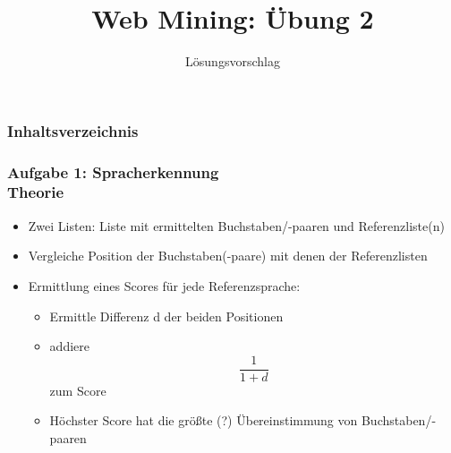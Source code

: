 \documentclass[accentcolor=tud7b,noresetcounter]{tudbeamer}
\title%
{Web Mining: Übung 2}
\subtitle{Lösungsvorschlag}
\author[Ingo Adrian und Steffen Pegenau]{}
\institute[Fachbereich Informatik]{}
\date[\today]
\begin{document}
  
  \begin{titleframe}
  \end{titleframe}
  
  \begin{frame}
	\frametitle{Inhaltsverzeichnis}
	\tableofcontents
  \end{frame}
  
  \begin{frame}
	\frametitle{Aufgabe 1: Spracherkennung\\
	Theorie}
	\begin{itemize}
		\item Zwei Listen: Liste mit ermittelten Buchstaben/-paaren und Referenzliste(n)
		\item Vergleiche Position der Buchstaben(-paare) mit denen der Referenzlisten
		\item Ermittlung eines Scores für jede Referenzsprache:
			\begin{itemize}
				\item Ermittle Differenz d der beiden Positionen
				\item addiere $$\frac{1}{1 + d}$$ zum Score
				\item Höchster Score hat die größte (?) Übereinstimmung von Buchstaben/-paaren
			\end{itemize}
	\end{itemize}
  \end{frame}  
  
\end{document}

